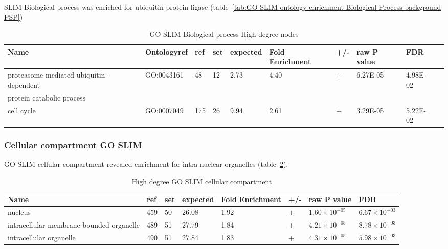 SLIM Biological process was enriched for ubiquitin protein ligase (table~\ref{tab:GO SLIM ontology enrichment Biological Process background PSP})
\begin{table}
\centering
\begin{adjustbox}{max width=\textwidth}
\begin{tabular}{l l l l l l l l l l}
Name & Ontologyref &ref & set&	expected &	Fold Enrichment &	+/-	&raw P value&FDR\\
\hline
proteasome-mediated ubiquitin-dependent &GO:0043161 & 48 & 	12 &	2.73 &	4.40 & 	+ & 	6.27E-05 & 	4.98E-02 \\
protein catabolic process\\
cell cycle& GO:0007049&	175 	&26 &	9.94& 	2.61 &	+ & 	3.29E-05& 5.22E-02\\
\end{tabular}
\end{adjustbox}
\caption{GO SLIM Biological process High degree nodes}
\label{tab: high degree slim biological process}
\end{table}

\subsubsection{Cellular compartment GO SLIM}
GO SLIM cellular compartment revealed enrichment for intra-nuclear organelles (table~\ref{tab: high degree slim cellular compartment}).

\begin{table}
\centering
\begin{adjustbox}{max width=\textwidth}
\begin{tabular}{llllllll}
  Name  &ref &set &	expected &	Fold Enrichment &	+/-	&raw P value&FDR\\
\hline
nucleus &	459& 	50& 	26.08& 	1.92& 	+ &	$1.60\times 10^{-05}$& 	$6.67\times 10^{-03}$\\
intracellular membrane-bounded organelle&	489&	51&	27.79&	1.84&	+&	$4.21\times10^{-05}$ &	$8.78\times 10^{-03}$\\
intracellular organelle&	490&	51&	27.84&	1.83&	+&	$4.31\times 10^{-05}$&	$5.98\times10^{-03}$\\
\end{tabular}
\end{adjustbox}
\caption{High degree GO SLIM cellular compartment}
\label{tab: high degree slim cellular compartment}
\end{table}

